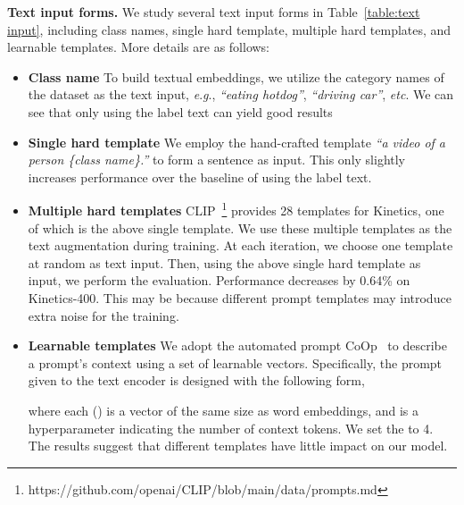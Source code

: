 \documentclass[letterpaper]{article} \usepackage{aaai23}  \usepackage{times}  \usepackage{helvet}  \usepackage{courier}  \usepackage[hyphens]{url}  \usepackage{graphicx} \urlstyle{rm} \def\UrlFont{\rm}  \usepackage{natbib}  \usepackage{caption} \frenchspacing  \setlength{\pdfpagewidth}{8.5in}  \setlength{\pdfpageheight}{11in}  \usepackage{algorithm}
\newcommand{\eg}{\textit{e}.\textit{g}.}
\begin{document}
\textbf{Text input forms.}
We study several text input forms in Table~\ref{table:text input}, including class names, single hard template, multiple hard templates, and learnable templates. More details are as follows:
\begin{itemize}
    \item \textbf{Class name} To build textual embeddings, we utilize the category names of the dataset as the text input, \eg, \emph{``eating hotdog''}, \emph{``driving car''}, \emph{etc}. We can see that only using the label text can yield good results
    \item \textbf{Single hard template} We employ the hand-crafted template \emph{``a video of a person \{class name\}.''} to form a sentence as input. This only slightly increases performance over the baseline of using the label text.
    \item \textbf{Multiple hard templates} CLIP~\footnote{https://github.com/openai/CLIP/blob/main/data/prompts.md} provides 28 templates for Kinetics, one of which is the above single template.
We use these multiple templates as the text augmentation during training.
At each iteration, we choose one template at random as text input. 
Then, using the above single hard template as input, we perform the evaluation.
Performance decreases by 0.64\% on Kinetics-400. This may be because different prompt templates may introduce extra noise for the training.
    \item \textbf{Learnable templates}
We adopt the automated prompt CoOp~\cite{coop} to describe a prompt's context using a set of learnable vectors. 
Specifically, the prompt given to the text encoder is designed with the following form,

where each  () is a vector of the same size as word embeddings, and  is a hyperparameter indicating the number of context tokens. We set the  to 4.
The results suggest that different templates have little impact on our model.
\end{itemize}
\end{document}
